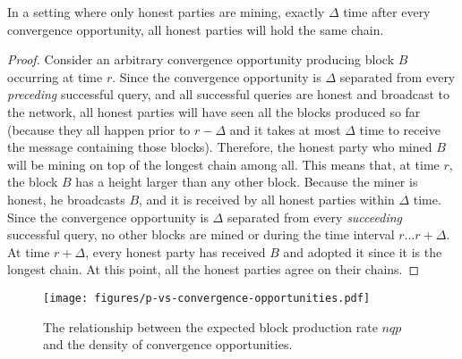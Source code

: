 \begin{lemma}\label{lem.honest-convergence}
    In a setting where only honest parties are mining, exactly $\Delta$ time after every convergence
    opportunity, all honest parties will hold the same chain.
\end{lemma}
\begin{proof}
    Consider an arbitrary convergence opportunity producing block $B$ occurring at time $r$.
    Since the convergence opportunity is $\Delta$ separated from every \emph{preceding} successful query,
    and all successful queries are honest and broadcast to the network, all honest parties will
    have seen all the blocks produced so far (because they all happen prior to $r - \Delta$ and it
    takes at most $\Delta$ time to receive the message containing those blocks).
    Therefore, the honest party who mined $B$
    will be mining on top of the longest chain among all. This means
    that, at time $r$, the block $B$ has a height larger than any other
    block. Because the miner is honest, he broadcasts $B$, and it is received by all honest parties within $\Delta$
    time. Since the convergence opportunity is $\Delta$ separated from every \emph{succeeding} successful
    query, no other blocks are mined or during the time interval $r \ldots r + \Delta$.
    At time $r + \Delta$, every honest party has received $B$ and adopted it since it is
    the longest chain. At this point, all the honest parties agree on their chains.
\end{proof}

\begin{figure}[h]
    \centering
    \texttt{[image: figures/p-vs-convergence-opportunities.pdf]}
    \caption{The relationship between the expected block production rate $nqp$
             and the density of convergence opportunities.}
    \label{fig.p-vs-convergence-opportunities}
\end{figure}

